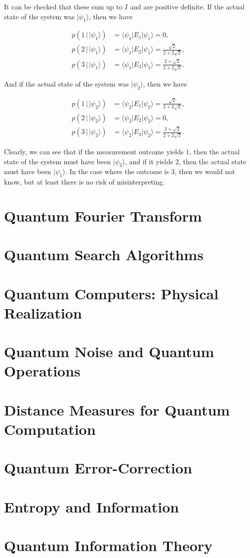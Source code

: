 \documentclass{article}
\theoremstyle{definition}
\begin{document}
      It can be checked that these sum up to $I$ and are positive definite. If the actual state of the system was $|\psi_1 \rangle$, then we have

      \begin{align*}
        p(1 \,|\, |\psi_1 \rangle) & = \langle \psi_1 | E_1 | \psi_1 \rangle = 0, \\
        p(2 \,|\, |\psi_1 \rangle) & = \langle \psi_1 | E_2 | \psi_1 \rangle = \frac{\sqrt{2}}{2 + 2\sqrt{2}}, \\
        p(3 \,|\, |\psi_1 \rangle) & = \langle \psi_1 | E_3 | \psi_1 \rangle =  \frac{2 + \sqrt{2}}{2 + 2\sqrt{2}}.
      \end{align*}

      And if the actual state of the system was $|\psi_2 \rangle$, then we have

      \begin{align*}
        p(1 \,|\, |\psi_2 \rangle) & = \langle \psi_2 | E_1 | \psi_2 \rangle = \frac{\sqrt{2}}{2 + 2\sqrt{2}}, \\
        p(2 \,|\, |\psi_2 \rangle) & = \langle \psi_2 | E_2 | \psi_2 \rangle = 0, \\
        p(3 \,|\, |\psi_2 \rangle) & = \langle \psi_2 | E_3 | \psi_2 \rangle =  \frac{2 + \sqrt{2}}{2 + 2\sqrt{2}}.
      \end{align*}

      Clearly, we can see that if the measurement outcome yields $1$, then the actual state of the system must have been $|\psi_2\rangle$, and if it yields $2$, then the actual state must have been $|\psi_1 \rangle$. In the case where the outcome is $3$, then we would not know, but at least there is no risk of misinterpreting.  

\section{Quantum Fourier Transform}


\section{Quantum Search Algorithms}


\section{Quantum Computers: Physical Realization}


\section{Quantum Noise and Quantum Operations}


\section{Distance Measures for Quantum Computation}


\section{Quantum Error-Correction}


\section{Entropy and Information}


\section{Quantum Information Theory}
\end{document}
